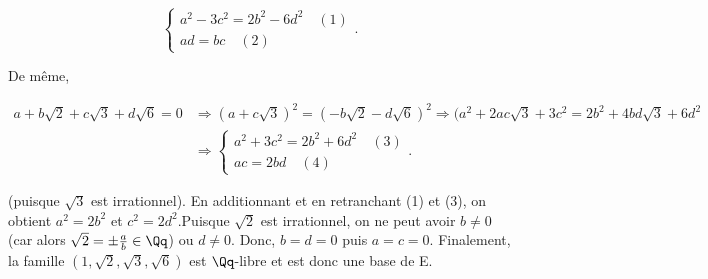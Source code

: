 {\begin{enumerate}
{$$\left\{
\begin{array}{l}
a^2-3c^2=2b^2-6d^2\quad(1)\\
ad=bc\quad(2)
\end{array}
\right..$$

De même,

\begin{align*}
a+b\sqrt{2}+c\sqrt{3}+d\sqrt{6}=0&\Rightarrow(a+c\sqrt{3})^2=(-b\sqrt{2}-d\sqrt{6})^2
\Rightarrow(a^2+2ac\sqrt{3}+3c^2=2b^2+4bd\sqrt{3}+6d^2\\
 &\Rightarrow\left\{
\begin{array}{l}
a^2+3c^2=2b^2+6d^2\quad(3)\\
ac=2bd\quad(4)
\end{array}
\right..
\end{align*}

(puisque $\sqrt{3}$ est irrationnel). En additionnant et en retranchant (1) et (3), on obtient $a^2=2b^2$ et
$c^2=2d^2$.Puisque $\sqrt{2}$ est irrationnel, on ne peut avoir $b\neq0$ (car alors $\sqrt{2}=\pm\frac{a}{b}\in\Qq$) 
ou $d\neq0$. Donc, $b=d=0$ puis  $a=c=0$. Finalement, la famille $(1,\sqrt{2},\sqrt{3},\sqrt{6})$ est $\Qq$-libre et
est donc une base de E.}
\end{enumerate}
}
